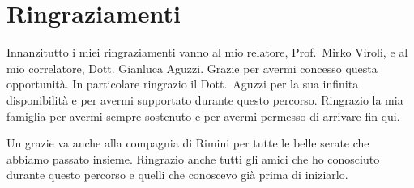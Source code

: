 \documentclass[12pt,a4paper,openright,twoside]{book}
\begin{document}
\mainmatter








\chapter{Ringraziamenti}
Innanzitutto i miei ringraziamenti vanno al mio relatore, Prof.\ Mirko Viroli, e al mio correlatore,
Dott. Gianluca Aguzzi. Grazie per avermi concesso questa opportunità.
In particolare ringrazio il Dott.\ Aguzzi per la sua infinita disponibilità e per avermi supportato durante questo percorso.
Ringrazio la mia famiglia per avermi sempre sostenuto e per avermi permesso di arrivare fin qui.

Un grazie va anche alla compagnia di Rimini per tutte le belle serate che abbiamo passato insieme.
Ringrazio anche tutti gli amici che ho conosciuto durante questo percorso e quelli che conoscevo già prima
di iniziarlo. 

\backmatter\nocite{*} %



\end{document}
